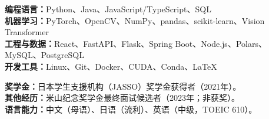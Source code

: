 \documentclass{resume}
\begin{document}
\textbf{编程语言：}Python、Java、JavaScript/TypeScript、SQL\\
\textbf{机器学习：}PyTorch、OpenCV、NumPy、pandas、scikit-learn、Vision Transformer\\
\textbf{工程与数据：}React、FastAPI、Flask、Spring Boot、Node.js、Polars、MySQL、PostgreSQL\\
\textbf{开发工具：}Linux、Git、Docker、CUDA、Conda、\LaTeX

\textbf{奖学金：}日本学生支援机构（JASSO）奖学金获得者（2021年）。\\
\textbf{其他经历：}米山纪念奖学金最终面试候选者（2023年；非获奖）。\\
\textbf{语言能力：}中文（母语）、日语（流利）、英语（中级，TOEIC 610）。
\end{document}
